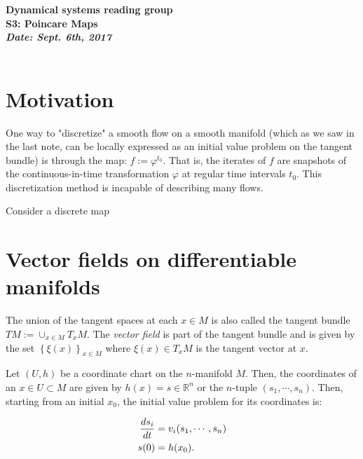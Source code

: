 \documentclass[11pt]{article}
\begin{document}
\begin{center}
{\large \bf	Dynamical systems reading group \\[1ex]
			S3: Poincare Maps
\\[2ex]
	   	{\it Date: Sept. 6th, 2017} \hfill \\[-1.5ex]	  
 	\hrulefill \\
				
}
\end{center}


\section{Motivation}

One way to "discretize" a smooth flow on a smooth manifold (which 
as we saw in the last note, can be locally expressed as an initial
value problem on the tangent bundle) is through the map: $f := \varphi^{t_0}$.
That is, the iterates of $f$ are snapshots of the continuous-in-time 
transformation $\varphi$ at regular time intervals $t_0$. This discretization 
method is incapable of describing many flows. 

Consider a discrete map 


\section{Vector fields on differentiable manifolds}

The union of the tangent spaces at each $x \in M$ is also called
the tangent bundle $TM := \cup_{x \in M} T_x M$. The \emph{vector field}
is part of the tangent bundle and is given by the set $\left\{\xi(x)\right\}_{x\in M}$
where $\xi(x) \in T_x M$ is the tangent vector at $x$. 

Let $(U,h)$ be a coordinate chart on the $n$-manifold $M$. Then, the coordinates
of an $x \in U \subset M$ are given by $h(x) = s \in \mathbb{R}^n$ or the 
$n$-tuple $(s_1,\cdots,s_n)$. Then, 
starting from an initial $x_0$, the initial value problem for its 
coordinates is:

\begin{align}
\notag \frac{d s_i}{dt} &= v_i(s_1,\cdots,s_n) \\
s(0) &= h(x_0).
\label{eqn:ivp}
\end{align}    
\end{document}
